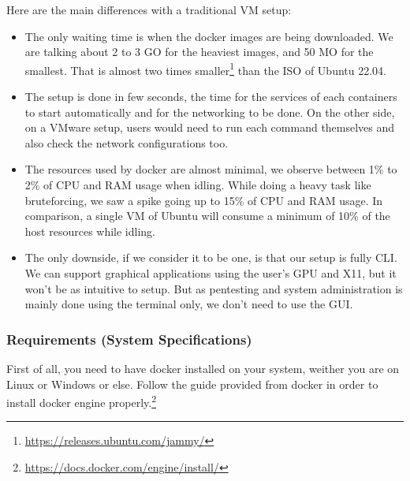 \documentclass[a4paper,11pt,singlespacing]{article}
\begin{document}
Here are the main differences with a traditional VM setup:
\begin{itemize}
    \item The only waiting time is when the docker images are being downloaded. We are talking about 2 to 3 GO for the heaviest images, and 50 MO for the smallest. That is almost two times smaller\footnote{\url{https://releases.ubuntu.com/jammy/}} than the ISO of Ubuntu 22.04.
    \item The setup is done in few seconds, the time for the services of each containers to start automatically and for the networking to be done. On the other side, on a VMware setup, users would need to run each command themselves and also check the network configurations too.
    \item The resources used by docker are almost minimal, we observe between 1\% to 2\% of CPU and RAM usage when idling. While doing a heavy task like bruteforcing, we saw a spike going up to 15\% of CPU and RAM usage. In comparison, a single VM of Ubuntu will consume a minimum of 10\% of the host resources while idling.
    \item The only downside, if we consider it to be one, is that our setup is fully CLI. We can support graphical applications using the user's GPU and X11, but it won't be as intuitive to setup. But as pentesting and system administration is mainly done using the terminal only, we don't need to use the GUI.
\end{itemize}

\newpage 

\subsubsection{Requirements (System Specifications)}
First of all, you need to have docker installed on your system, weither you are on Linux or Windows or else. Follow the guide provided from docker in order to install docker engine properly.\footnote{\url{https://docs.docker.com/engine/install/}}\\
\end{document}
